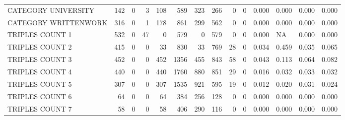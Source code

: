 \begin{tabular}{lrrrrrrrrrllll}
 CATEGORY UNIVERSITY      &             142 &             0 &               3 &             108 &             589 &  323 &  266 &    0 &    0 & 0.000 & 0.000 & 0.000 & 0.000 \\
 CATEGORY WRITTENWORK     &             316 &             0 &               1 &             178 &             861 &  299 &  562 &    0 &    0 & 0.000 & 0.000 & 0.000 & 0.000 \\
 TRIPLES COUNT 1          &             532 &             0 &              47 &               0 &             579 &    0 &  579 &    0 &    0 & 0.000 & NA    & 0.000 & 0.000 \\
 TRIPLES COUNT 2          &             415 &             0 &               0 &              33 &             830 &   33 &  769 &   28 &    0 & 0.034 & 0.459 & 0.035 & 0.065 \\
 TRIPLES COUNT 3          &             452 &             0 &               0 &             452 &            1356 &  455 &  843 &   58 &    0 & 0.043 & 0.113 & 0.064 & 0.082 \\
 TRIPLES COUNT 4          &             440 &             0 &               0 &             440 &            1760 &  880 &  851 &   29 &    0 & 0.016 & 0.032 & 0.033 & 0.032 \\
 TRIPLES COUNT 5          &             307 &             0 &               0 &             307 &            1535 &  921 &  595 &   19 &    0 & 0.012 & 0.020 & 0.031 & 0.024 \\
 TRIPLES COUNT 6          &              64 &             0 &               0 &              64 &             384 &  256 &  128 &    0 &    0 & 0.000 & 0.000 & 0.000 & 0.000 \\
 TRIPLES COUNT 7          &              58 &             0 &               0 &              58 &             406 &  290 &  116 &    0 &    0 & 0.000 & 0.000 & 0.000 & 0.000 \\
\hline
\end{tabular}